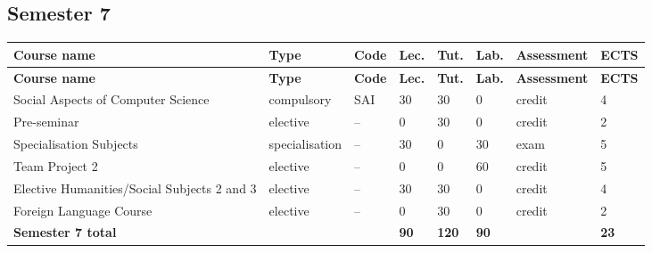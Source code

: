 \documentclass[12pt,a4paper]{article}
\newcommand{\thdrule}{\noalign{\global\setlength{\extrarowheight}{0pt}}}
\newcommand{\thdend}{\noalign{\global\setlength{\extrarowheight}{4pt}}}
\begin{document}
\clearpage
\subsection*{Semester 7}

{\scriptsize
\begin{longtable}{m{5.0cm}m{1.9cm}m{0.75cm}m{0.85cm}m{0.85cm}m{0.85cm}m{1.45cm}m{0.9cm}}
\thdrule\toprule
\rowcolor{pjatkRed}
{\color{white}\footnotesize\textbf{\vphantom{Ag}Course name}} & {\color{white}\footnotesize\textbf{\vphantom{Ag}Type}} & {\color{white}\footnotesize\textbf{\vphantom{Ag}Code}} & {\color{white}\footnotesize\textbf{\vphantom{Ag}Lec.}} & {\color{white}\footnotesize\textbf{\vphantom{Ag}Tut.}} & {\color{white}\footnotesize\textbf{\vphantom{Ag}Lab.}} & {\color{white}\footnotesize\textbf{\vphantom{Ag}Assessment}} & {\color{white}\footnotesize\textbf{\vphantom{Ag}ECTS}} \\
\midrule\thdend
\endfirsthead
\thdrule\toprule
\rowcolor{pjatkRed}
{\color{white}\footnotesize\textbf{\vphantom{Ag}Course name}} & {\color{white}\footnotesize\textbf{\vphantom{Ag}Type}} & {\color{white}\footnotesize\textbf{\vphantom{Ag}Code}} & {\color{white}\footnotesize\textbf{\vphantom{Ag}Lec.}} & {\color{white}\footnotesize\textbf{\vphantom{Ag}Tut.}} & {\color{white}\footnotesize\textbf{\vphantom{Ag}Lab.}} & {\color{white}\footnotesize\textbf{\vphantom{Ag}Assessment}} & {\color{white}\footnotesize\textbf{\vphantom{Ag}ECTS}} \\
\midrule\thdend
\endhead
\rowcolor{tableRowLight} Social Aspects of Computer Science & {\scriptsize compulsory} & SAI & 30 & 30 & 0 & {\scriptsize credit} & 4 \\
\rowcolor{tableElective} Pre-seminar & {\scriptsize elective} & -- & 0 & 30 & 0 & {\scriptsize credit} & 2 \\
\rowcolor{tableElective} Specialisation Subjects & {\scriptsize specialisation} & -- & 30 & 0 & 30 & {\scriptsize exam} & 5 \\
\rowcolor{tableElective} Team Project 2 & {\scriptsize elective} & -- & 0 & 0 & 60 & {\scriptsize credit} & 5 \\
\rowcolor{tableElective} Elective Humanities/Social Subjects 2 and 3 & {\scriptsize elective} & -- & 30 & 30 & 0 & {\scriptsize credit} & 4 \\
\rowcolor{tableElective} Foreign Language Course & {\scriptsize elective} & -- & 0 & 30 & 0 & {\scriptsize credit} & 2 \\
\midrule[\heavyrulewidth]
\rowcolor{tableSummary} \textbf{Semester 7 total} & & & \textbf{90} & \textbf{120} & \textbf{90} & & \textbf{23} \\
\bottomrule
\end{longtable}}
\end{document}
